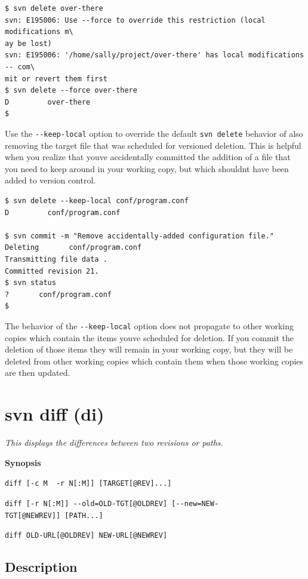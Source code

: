 \begin{verbatim}
$ svn delete over-there 
svn: E195006: Use --force to override this restriction (local modifications m\
ay be lost)
svn: E195006: '/home/sally/project/over-there' has local modifications -- com\
mit or revert them first
$ svn delete --force over-there 
D         over-there
$
\end{verbatim}

Use the \texttt{-\/-keep-local} option to override the default
\texttt{svn\ delete} behavior of also removing the target file that was
scheduled for versioned deletion. This is helpful when you realize that
you\textquotesingle ve accidentally committed the addition of a file
that you need to keep around in your working copy, but which
shouldn\textquotesingle t have been added to version control.

\begin{verbatim}
$ svn delete --keep-local conf/program.conf
D         conf/program.conf

$ svn commit -m "Remove accidentally-added configuration file."
Deleting       conf/program.conf
Transmitting file data .
Committed revision 21.
$ svn status
?       conf/program.conf
$
\end{verbatim}

The behavior of the \texttt{-\/-keep-local} option does not propagate to
other working copies which contain the items you\textquotesingle ve
scheduled for deletion. If you commit the deletion of those items they
will remain in your working copy, but they will be deleted from other
working copies which contain them when those working copies are then
updated.

\section{svn diff (di)}\label{svn.ref.svn.c.diff}

\emph{This displays the differences between two revisions or paths.}

\textbf{Synopsis}

\texttt{diff\ {[}-c\ M\ \textbar{}\ -r\ N{[}:M{]}{]}\ {[}TARGET{[}@REV{]}...{]}}

\texttt{diff\ {[}-r\ N{[}:M{]}{]}\ -\/-old=OLD-TGT{[}@OLDREV{]}\ {[}-\/-new=NEW-TGT{[}@NEWREV{]}{]}\ {[}PATH...{]}}

\texttt{diff\ OLD-URL{[}@OLDREV{]}\ NEW-URL{[}@NEWREV{]}}

\subsection{Description}

